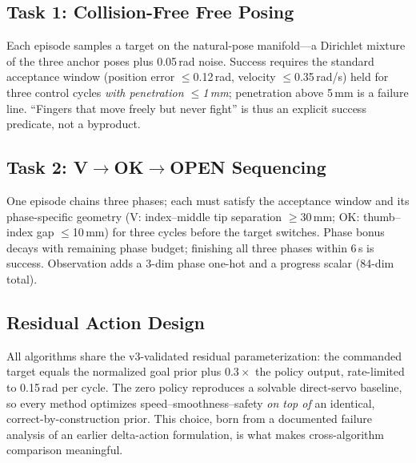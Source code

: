 \documentclass[conference]{IEEEtran}
\begin{document}
\subsection{Task 1: Collision-Free Free Posing}
Each episode samples a target on the natural-pose manifold---a Dirichlet
mixture of the three anchor poses plus 0.05\,rad noise. Success requires the
standard acceptance window (position error $\le$0.12\,rad, velocity
$\le$0.35\,rad/s) held for three control cycles \emph{with penetration
$\le$1\,mm}; penetration above 5\,mm is a failure line. ``Fingers that move
freely but never fight'' is thus an explicit success predicate, not a
byproduct.

\subsection{Task 2: V$\to$OK$\to$OPEN Sequencing}
One episode chains three phases; each must satisfy the acceptance window and
its phase-specific geometry (V: index--middle tip separation $\ge$30\,mm;
OK: thumb--index gap $\le$10\,mm) for three cycles before the target
switches. Phase bonus decays with remaining phase budget; finishing all three
phases within 6\,s is success. Observation adds a 3-dim phase one-hot and a
progress scalar (84-dim total).

\subsection{Residual Action Design}
All algorithms share the v3-validated residual parameterization: the commanded
target equals the normalized goal prior plus $0.3\times$ the policy output,
rate-limited to 0.15\,rad per cycle. The zero policy reproduces a solvable
direct-servo baseline, so every method optimizes speed--smoothness--safety
\emph{on top of} an identical, correct-by-construction prior. This choice,
born from a documented failure analysis of an earlier delta-action
formulation, is what makes cross-algorithm comparison meaningful.
\end{document}
